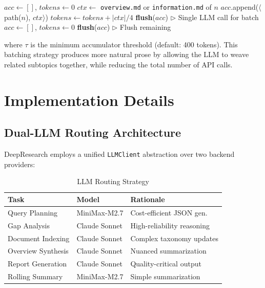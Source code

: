 \documentclass[conference]{IEEEtran}
\begin{document}
\begin{algorithm}[H]
\caption{Accumulator-Based Lazy LLM Synthesis}
\begin{algorithmic}[1]
\STATE $acc \gets []$, $tokens \gets 0$
    \STATE $ctx \gets$ \texttt{overview.md} or \texttt{information.md} of $n$
        \STATE $acc$.append($\langle$path($n$), $ctx\rangle$)
        \STATE $tokens \gets tokens + |ctx| / 4$
            \STATE \textbf{flush}($acc$) $\triangleright$ Single LLM call for batch
            \STATE $acc \gets []$, $tokens \gets 0$
        \ENDIF
    \ENDIF
\ENDFOR
{}
    \STATE \textbf{flush}($acc$) $\triangleright$ Flush remaining
\ENDIF
\end{algorithmic}
\end{algorithm}

where $\tau$ is the minimum accumulator threshold (default: 400 tokens). This batching strategy produces more natural prose by allowing the LLM to weave related subtopics together, while reducing the total number of API calls.

\section{Implementation Details}

\subsection{Dual-LLM Routing Architecture}

DeepResearch employs a unified \texttt{LLMClient} abstraction over two backend providers:

\begin{table}[htbp]
\caption{LLM Routing Strategy}
\label{tab:llm_routing}
\centering
\scriptsize
\begin{tabular}{@{}lll@{}}
\toprule
\textbf{Task} & \textbf{Model} & \textbf{Rationale} \\
\midrule
Query Planning & MiniMax-M2.7 & Cost-efficient JSON gen. \\
Gap Analysis & Claude Sonnet & High-reliability reasoning \\
Document Indexing & Claude Sonnet & Complex taxonomy updates \\
Overview Synthesis & Claude Sonnet & Nuanced summarization \\
Report Generation & Claude Sonnet & Quality-critical output \\
Rolling Summary & MiniMax-M2.7 & Simple summarization \\
\bottomrule
\end{tabular}
\end{table}
\end{document}
